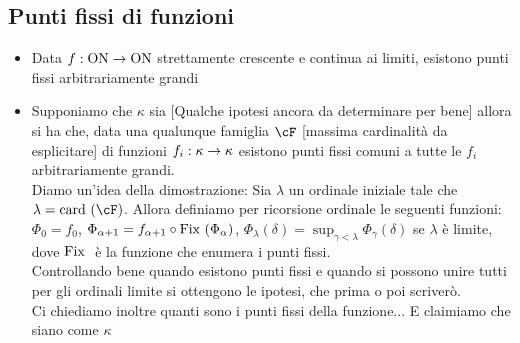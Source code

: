\documentclass[a4paper,NoNotes,GeneralMath]{stdmdoc}
\newcommand{\card}[1]{\text{card }({#1})}
\newcommand{\ON}{\text{ON}}
\begin{document}
	\subsection*{Punti fissi di funzioni}
	\begin{itemize}
		\item Data $f: \ON \rar \ON$ strettamente crescente e continua ai limiti, esistono punti fissi arbitrariamente grandi
		\item Supponiamo che $\kappa$ sia [Qualche ipotesi ancora da determinare per bene] allora si ha che, data una qualunque famiglia $\cF$ [massima cardinalità da esplicitare] di funzioni $f_i: \kappa \rightarrow \kappa$ esistono punti fissi comuni a tutte le $f_i$ arbitrariamente grandi. \\
			Diamo un'idea della dimostrazione: Sia $\lambda$ un ordinale iniziale tale che $\lambda = \card{\cF}$. Allora definiamo per ricorsione ordinale le seguenti funzioni: $\Phi_0 = f_0$, $\Phi_{\alpha + 1} = f_{\alpha + 1} \circ \mbox{Fix }(\Phi_\alpha)$, $\Phi_\lambda (\delta) = \sup_{\gamma < \lambda} \Phi_{\gamma}(\delta) $ se $\lambda$ è limite, dove $\mbox{Fix }$ è la funzione che enumera i punti fissi. \\
			Controllando bene quando esistono punti fissi e quando si possono unire tutti per gli ordinali limite si ottengono le ipotesi, che prima o poi scriverò. \\
			Ci chiediamo inoltre quanti sono i punti fissi della funzione... E claimiamo che siano come $\kappa$
	\end{itemize}
	
\end{document}

